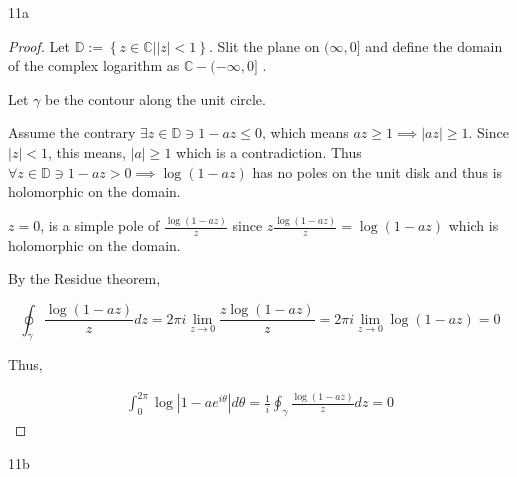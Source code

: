 \documentclass{article}
\newcommand{\C}{\mathbb{C}}
\newcommand{\abs}[1]{\left\lvert #1\right\rvert}
\begin{document}
\bigskip

\begin{PROB}{11a}\label{Problem 11a.}
\end{PROB}
\begin{proof}

    Let $\mathbb{D} := \left\{ z \in \C | |z| < 1 \right\}$. Slit the plane on $(\infty, 0]$ and define the domain of the complex logarithm as $\C - (-\infty , 0]$ .  

    Let $\gamma$ be the contour along the unit circle.  

    Assume the contrary $\exists z \in \mathbb{D} \ni 1 - az \leq 0$, which means $az \geq 1 \implies \abs{az} \geq 1$. Since $\abs{z} < 1$, this means, $\abs{a} \geq 1$ which is a contradiction. Thus $\forall z \in \mathbb{D} \ni 1 - az > 0 \implies \log(1- az)$ has no poles on the unit disk and thus is holomorphic on the domain. 
    
    $z = 0$, is a simple pole of $\frac{\log(1 - az)}{z}$ since $z\frac{\log(1 - az)}{z} = \log(1 - az)$ which is holomorphic on the domain. 
    
    By the Residue theorem, 

    \begin{equation*}
        \oint_\gamma \frac{\log(1 - a z)}{z} dz = 2 \pi i \lim_{z \to 0} \frac{z \log(1 - az)}{z} = 2 \pi i \lim_{z \to 0} \log(1 - az) = 0
    \end{equation*}

    Thus, 

    \begin{align*}
        \int_{0}^{2 \pi} \log \abs{1 - a e^{i \theta}} d \theta = \frac{1}{i}\oint_\gamma \frac{\log(1 - a z)}{z} dz = 0
    \end{align*}
\end{proof}
\begin{PROB}{11b}\label{Problem 11b.} 
\end{PROB}
\end{document}

